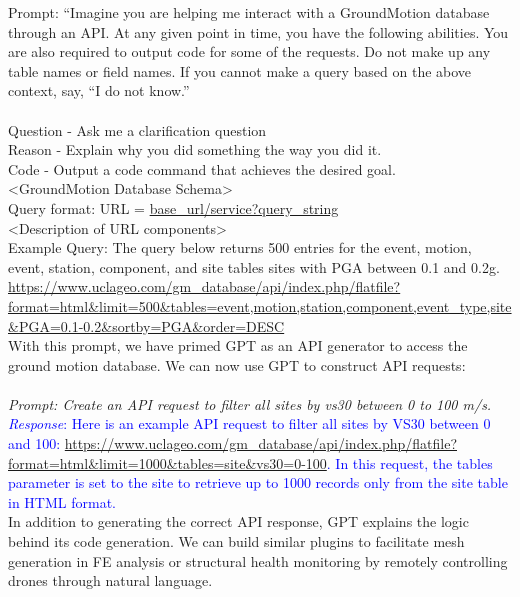 \documentclass{article}
\begin{document}
\textcolor{RedOrange}{Prompt: ``Imagine you are helping me interact with a GroundMotion database through an API. At any given point in time, you have the following abilities. You are also required to output code for some of the requests. Do not make up any table names or field names. If you cannot make a query based on the above context, say, ``I do not know.”\\\\
Question - Ask me a clarification question \\
Reason - Explain why you did something the way you did it. \\
Code - Output a code command that achieves the desired goal.\\
\textless GroundMotion Database Schema\textgreater\\
Query format: URL = \url{base_url/service?query_string} \\
\textless Description of URL components\textgreater\\
Example Query: The query below returns 500 entries for the event, motion, event, station, component, and site tables sites with PGA between 0.1 and 0.2g. 
\url{https://www.uclageo.com/gm_database/api/index.php/flatfile?format=html&limit=500&tables=event,motion,station,component,event_type,site&PGA=0.1-0.2&sortby=PGA&order=DESC}}
\\
With this prompt, we have primed GPT as an API generator to access the ground motion database. We can now use GPT to construct API requests:
\\\\
\textit{\textcolor{RedOrange}{Prompt: Create an API request to filter all sites by vs30 between 0 to 100 m/s.
}}
\\
\textcolor{blue}{\textit{Response}: Here is an example API request to filter all sites by VS30 between 0 and 100: \url{https://www.uclageo.com/gm_database/api/index.php/flatfile?format=html&limit=1000&tables=site&vs30=0-100}. In this request, the tables parameter is set to the site to retrieve up to 1000 records only from the site table in HTML format. }
\\In addition to generating the correct API response, GPT explains the logic behind its code generation. We can build similar plugins to facilitate mesh generation in FE analysis or structural health monitoring by remotely controlling drones through natural language.
\end{document}
